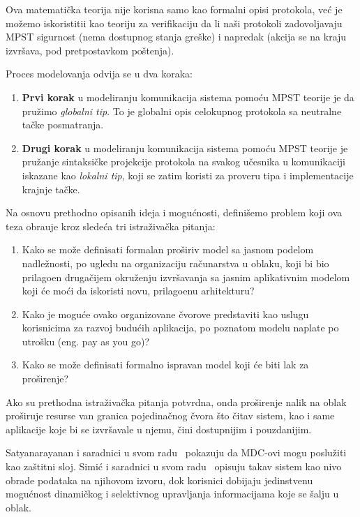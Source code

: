 Ova matemati\v cka teorija nije korisna samo kao formalni opisi protokola, ve\'c je mo\v zemo iskoristitii kao teoriju za verifikaciju da li na\v si protokoli zadovoljavaju MPST sigurnost (nema dostupnog stanja gre\v ske) i napredak (akcija se na kraju izvr\v sava, pod pretpostavkom po\v stenja).

Proces modelovanja odvija se u dva koraka:

\begin{enumerate}[start=1,label={(\bfseries \arabic*)}]
	\item \textbf{Prvi korak} u modeliranju komunikacija sistema pomo\'cu MPST teorije je da pru\v zimo \emph{globalni tip}. To je globalni opis celokupnog protokola sa neutralne ta\v cke posmatranja.
	\item \textbf{Drugi korak} u modeliranju komunikacija sistema pomo\'cu MPST teorije je pru\v zanje sintaksi\v cke projekcije protokola na svakog u\v cesnika u komunikaciji iskazane kao \emph{lokalni tip}, koji se zatim koristi za proveru tipa i implementacije krajnje ta\v cke.
\end{enumerate}

Na osnovu prethodno opisanih ideja i mogu\'cnosti, defini\v semo problem koji ova teza obra\dj uje kroz slede\'ca tri istra\v ziva\v cka pitanja:

\begin{enumerate}[start=1,label={(\bfseries \arabic*)}]\label{rez:questions}
	\item Kako se mo\v ze definisati formalan pro\v siriv model sa jasnom podelom nadle\v znosti, po ugledu na organizaciju ra\v cunarstva u oblaku, koji bi bio prilago\dj en druga\v cijem okru\v zenju izvr\v savanja sa jasnim aplikativnim modelom koji \'ce moći da iskoristi novu, prilago\dj enu arhitekturu?
	\item Kako je mogu\'ce ovako organizovane \v cvorove predstaviti kao uslugu korisnicima za razvoj budu\'cih aplikacija, po poznatom modelu naplate po utro\v sku (eng. pay as you go)?
	\item Kako se mo\v ze definisati formalno ispravan model koji \'ce biti lak za pro\v sirenje?
\end{enumerate}

Ako su prethodna istra\v ziva\v cka pitanja potvrdna, onda pro\v sirenje nalik na oblak pro\v siruje resurse van granica pojedina\v cnog \v cvora \v sto \v citav sistem, kao i same aplikacije koje bi se izvr\v savale u njemu, \v cini dostupnijim i pouzdanijim.

Satyanarayanan i saradnici u svom radu~\cite{SatyanarayananK19} pokazuju da MDC-ovi mogu poslu\v ziti kao za\v stitni sloj. Simi\'c i saradnici u svom radu~\cite{inproceedingsSimic1}  opisuju takav sistem kao nivo obrade podataka na njihovom izvoru, dok korisnici dobijaju jedinstvenu mogu\'cnost dinami\v ckog i selektivnog upravljanja informacijama koje se \v salju u oblak. 

